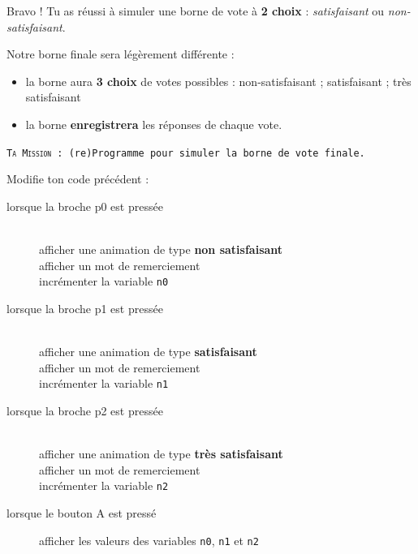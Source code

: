 \begin{eleve}
    Bravo ! Tu as réussi à simuler une borne de vote à \textbf{2 choix} : \textit{satisfaisant} ou \textit{non-satisfaisant}.
    
    Notre borne finale sera légèrement différente : 
    \begin{itemize}
        \item la borne aura \textbf{3 choix} de votes possibles : non-satisfaisant ; satisfaisant ; très satisfaisant
        \item la borne \textbf{enregistrera} les réponses de chaque vote.
    \end{itemize}
    
    \vspace{1em}
    \texttt{\textsc{Ta Mission} : (re)Programme \mb pour simuler la borne de vote finale.}
    \vspace{1em}
    
    Modifie ton code précédent :
    \begin{description}
        \item[lorsque la broche p0 est pressée]~\\
            afficher une animation de type \textbf{non satisfaisant}\\
            afficher un mot de remerciement\\
            incrémenter la variable \texttt{\large{n0}}
        \item[lorsque la broche p1 est pressée]~\\
            afficher une animation de type \textbf{satisfaisant}\\
            afficher un mot de remerciement\\
            incrémenter la variable \texttt{\large{n1}}
        \item[lorsque la broche p2 est pressée]~\\
            afficher une animation de type \textbf{très satisfaisant}\\
            afficher un mot de remerciement\\
            incrémenter la variable \texttt{\large{n2}}
        \item[lorsque le bouton A est pressé] afficher les valeurs des variables \texttt{n0}, \texttt{n1} et \texttt{n2}
    \end{description}
\end{eleve}

\newpage

